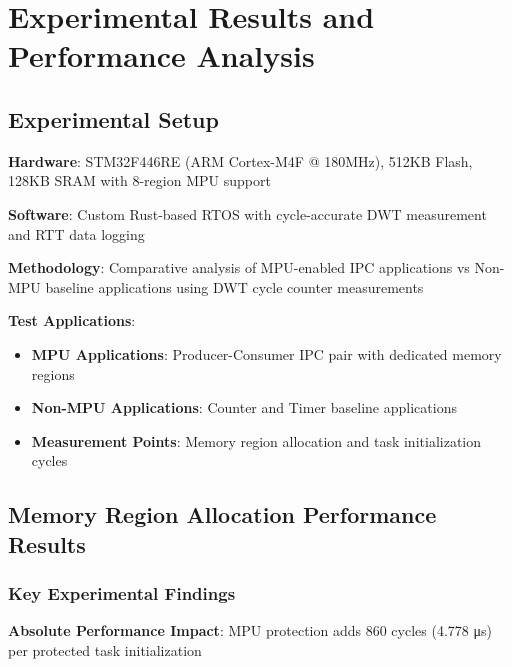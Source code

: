 \chapter{Experimental Results and Performance Analysis}
\label{sec:experimental-results}

\section{Experimental Setup}

\textbf{Hardware}: STM32F446RE (ARM Cortex-M4F @ 180MHz), 512KB Flash, 128KB SRAM with 8-region MPU support

\textbf{Software}: Custom Rust-based RTOS with cycle-accurate DWT measurement and RTT data logging

\textbf{Methodology}: Comparative analysis of MPU-enabled IPC applications vs Non-MPU baseline applications using DWT cycle counter measurements

\textbf{Test Applications}:
\begin{itemize}
    \item \textbf{MPU Applications}: Producer-Consumer IPC pair with dedicated memory regions
    \item \textbf{Non-MPU Applications}: Counter and Timer baseline applications
    \item \textbf{Measurement Points}: Memory region allocation and task initialization cycles
\end{itemize}

\section{Memory Region Allocation Performance Results}

\subsection{Key Experimental Findings}




\textbf{Absolute Performance Impact}: MPU protection adds 860 cycles (4.778 μs) per protected task initialization

